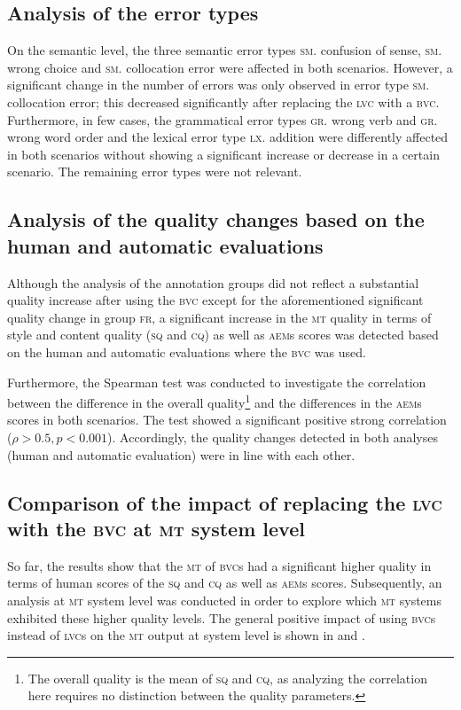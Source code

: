 \documentclass[output=paper]{langsci/langscibook}
\begin{document}
\subsection{Analysis of the error types}
On the semantic level, the three semantic error types \textsc{sm}. confusion of sense, \textsc{sm}. wrong choice and \textsc{sm}. collocation error were affected in both scenarios. However, a significant change in the number of errors was only observed in error type \textsc{sm}. collocation error; this decreased significantly after replacing the \textsc{lvc} with a \textsc{bvc}. Furthermore, in few cases, the grammatical error types \textsc{gr}. wrong verb and \textsc{gr}. wrong word order and the lexical error type \textsc{lx}. addition were differently affected in both scenarios without showing a significant increase or decrease in a certain scenario. The remaining error types were not relevant.

\subsection{Analysis of the quality changes based on the human and automatic evaluations}
Although the analysis of the annotation groups did not reflect a substantial quality increase after using the \textsc{bvc} except for the aforementioned significant quality change in group \textsc{fr}, a significant increase in the \textsc{mt} quality in terms of style and content quality (\textsc{sq} and \textsc{cq}) as well as \textsc{aem}s scores was detected based on the human and automatic evaluations where the \textsc{bvc} was used.



Furthermore, the Spearman test was conducted to investigate the correlation between the difference in the overall quality\footnote{The overall quality is the mean of \textsc{sq} and \textsc{cq}, as analyzing the correlation here requires no distinction between the quality parameters.} and the differences in the \textsc{aem}s scores in both scenarios. The test showed a significant positive strong correlation ($\rho > 0.5, p < 0.001$). Accordingly, the quality changes detected in both analyses (human and automatic evaluation) were in line with each other.



\subsection{Comparison of the impact of replacing the \textsc{lvc} with the \textsc{bvc} at \textsc{mt} system level}
So far, the results show that the \textsc{mt} of \textsc{bvc}s had a significant higher quality in terms of human scores of the \textsc{sq} and \textsc{cq} as well as \textsc{aem}s scores. Subsequently, an analysis at \textsc{mt} system level was conducted in order to explore which \textsc{mt} systems exhibited these higher quality levels. The general positive impact of using \textsc{bvc}s instead of \textsc{lvc}s on the \textsc{mt} output at system level is shown in  and .
\end{document}
